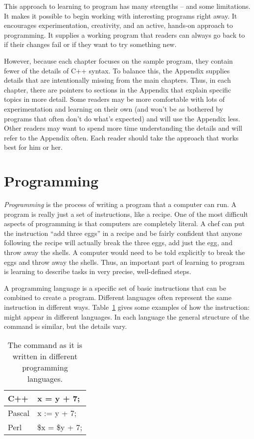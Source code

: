 This approach to learning to program has many strengths -- and some limitations.  It makes it possible to begin working with interesting programs right away.  It encourages experimentation, creativity, and an active, hands-on approach to programming.  It supplies a working program that readers can always go back to if their changes fail or if  they want to try something new.

However,  because each chapter focuses on the sample program, they contain fewer of the details of C++ syntax.  To balance this, the Appendix supplies details that are intentionally missing from the main chapters.  Thus, in each chapter, there are pointers to sections in the Appendix that explain specific topics in more detail.  Some readers may be more comfortable with lots of experimentation and learning on their own (and won't be as bothered by programs that often don't do what's expected) and will use the Appendix less. Other readers may want to spend more time understanding the details and will refer to the Appendix often.  Each reader should take the approach that works best for him or her.

\section{Programming}

\emph{Programming} is the process of writing a program that a computer can run.  A program is really just a set of instructions, like a recipe.  One of the most difficult aspects of programming is that computers are completely literal.  A chef can put the instruction ``add three eggs'' in a recipe and be fairly confident that anyone following the recipe will actually break the three eggs, add just the egg, and throw away the shells.  A computer would need to be told explicitly to break the eggs and throw away the shells.  Thus, an important part of  learning to program is learning to describe tasks in very precise, well-defined steps.  

A programming language is a specific set of basic instructions that can be combined to create a program.  Different languages often represent the same instruction in different ways.  Table~\ref{tab:instructions} gives some examples of how the instruction:  might appear in different languages.  In each language the general structure of the command is similar, but the details vary.

\begin{table}[ht]
\centering
\begin{tabular}{|l|l|}
\hline
C++ & x = y + 7; \\
\hline
Pascal & x := y + 7; \\
\hline
Perl & \$x = \$y + 7; \\
\hline
\end{tabular}
\caption{The command  as it is written in different programming languages.}
\label{tab:instructions}
\end{table}

